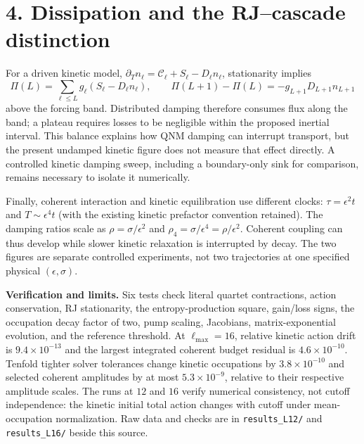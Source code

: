 \documentclass[10pt,a4paper]{article}
\begin{document}
\section*{4. Dissipation and the RJ--cascade distinction}
For a driven kinetic model,
$\partial_T n_\ell=\mathcal C_\ell+S_\ell-D_\ell n_\ell$, stationarity implies
\begin{equation}
 \Pi(L)=\sum_{\ell\le L}g_\ell(S_\ell-D_\ell n_\ell),\qquad
 \Pi(L+1)-\Pi(L)=-g_{L+1}D_{L+1}n_{L+1}
\end{equation}
above the forcing band. Distributed damping therefore consumes flux along
the band; a plateau requires losses to be negligible within the proposed
inertial interval. This balance explains how QNM damping can interrupt
transport, but the present undamped kinetic figure does not measure that
effect directly. A controlled kinetic damping sweep, including a boundary-only
sink for comparison, remains necessary to isolate it numerically.

Finally, coherent interaction and kinetic equilibration use different clocks:
$\tau=\epsilon^2t$ and $T\sim\epsilon^4t$ (with the existing kinetic prefactor
convention retained). The damping ratios scale as
$\rho=\sigma/\epsilon^2$ and $\rho_4=\sigma/\epsilon^4=\rho/\epsilon^2$.
Coherent coupling can thus develop while slower kinetic relaxation is
interrupted by decay. The two figures are separate controlled experiments,
not two trajectories at one specified physical $(\epsilon,\sigma)$.

\textbf{Verification and limits.}
Six tests check literal quartet contractions, action conservation, RJ
stationarity, the entropy-production square, gain/loss signs, the occupation
decay factor of two, pump scaling, Jacobians, matrix-exponential evolution,
and the reference threshold. At $\ell_{\max}=16$, relative kinetic action
drift is $9.4\times10^{-13}$ and the largest integrated coherent budget
residual is $4.6\times10^{-10}$. Tenfold tighter solver tolerances change
kinetic occupations by $3.8\times10^{-10}$ and selected coherent amplitudes
by at most $5.3\times10^{-9}$, relative to their respective amplitude scales.
The runs at $12$ and $16$ verify numerical consistency, not cutoff independence:
the kinetic initial total action changes with cutoff under mean-occupation
normalization. Raw data and checks are in
\texttt{results\_L12/} and \texttt{results\_L16/} beside this source.
\end{document}
